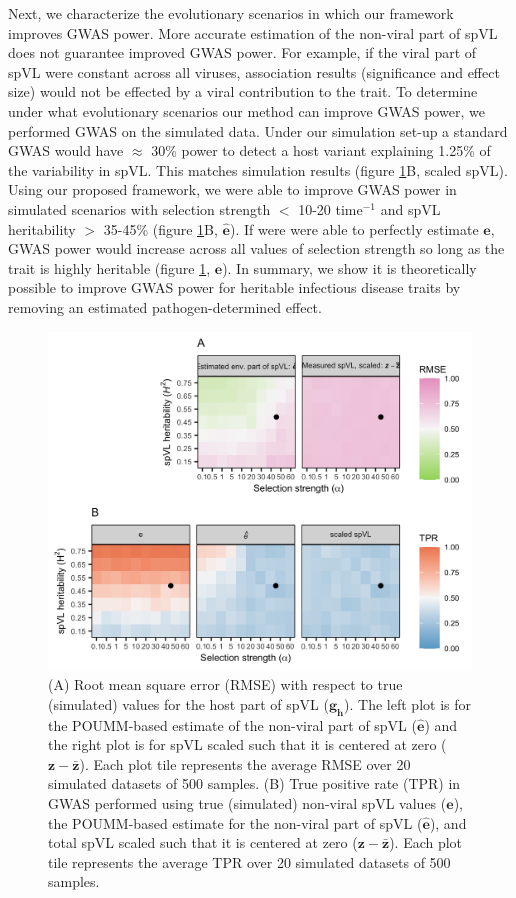 \documentclass[]{article}
\begin{document}
\begin{doublespace}
Next, we characterize the evolutionary scenarios in which our framework improves GWAS power. More accurate estimation of the non-viral part of spVL does not guarantee improved GWAS power. For example, if the viral part of spVL were constant across all viruses, association results (significance and effect size) would not be effected by a viral contribution to the trait. To determine under what evolutionary scenarios our method can improve GWAS power, we performed GWAS on the simulated data. Under our simulation set-up a standard GWAS would have $\approx$ 30\% power to detect a host variant explaining 1.25\% of the variability in spVL. This matches simulation results (figure \ref{fig:simulationResults}B, scaled spVL). Using our proposed framework, we were able to improve GWAS power in simulated scenarios with selection strength $<$ 10-20 time$^{-1}$ and spVL heritability $>$ 35-45\% (figure \ref{fig:simulationResults}B, $\bm{\hat{e}}$). If were were able to perfectly estimate $\bm{e}$, GWAS power would increase across all values of selection strength so long as the trait is highly heritable (figure \ref{fig:simulationResults}, $\bm{e}$). In summary, we show it is theoretically possible to improve GWAS power for heritable infectious disease traits by removing an estimated pathogen-determined effect.

\begin{figure}[H]
	\begin{center}
		\includegraphics[width=0.75\linewidth]{figures/simulation_results}
		\caption{(A) Root mean square error (RMSE) with respect to true (simulated) values for the host part of spVL ($\bm{{g_h}}$). The left plot is for the POUMM-based estimate of the non-viral part of spVL ($\bm{\hat{e}}$) and the right plot is for spVL scaled such that it is centered at zero ($\bm{z} - \bm{\bar{z}}$). Each plot tile represents the average RMSE over 20 simulated datasets of 500 samples. (B) True positive rate (TPR) in GWAS performed using true (simulated) non-viral spVL values ($\bm{e}$), the POUMM-based estimate for the non-viral part of spVL ($\bm{\hat{e}}$), and total spVL scaled such that it is centered at zero ($\bm{z} - \bm{\bar{z}}$). Each plot tile represents the average TPR over 20 simulated datasets of 500 samples.}
		\label{fig:simulationResults}
	\end{center}
\end{figure}


\end{doublespace}
\end{document}
